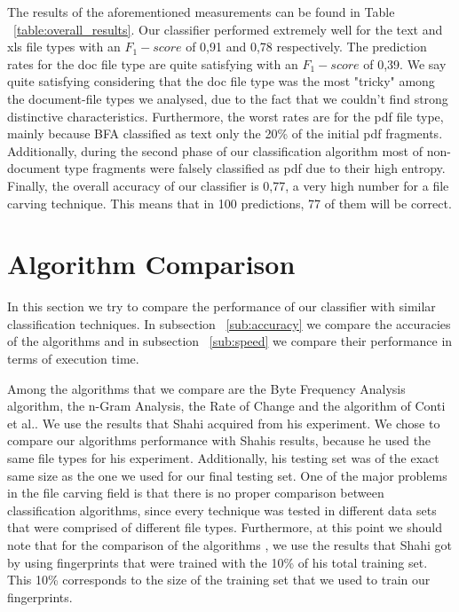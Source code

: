 The results of the aforementioned measurements can be found in Table ~\ref{table:overall_results}. Our classifier performed extremely well for the text and xls file types with an ${F_1}-score$ of 0,91 and 0,78 respectively. The prediction rates  for the doc file type are quite satisfying with an ${F_1}-score$  of 0,39. We say quite satisfying considering that the doc file type was the most "tricky" among the document-file types we analysed, due to the fact that we couldn't find strong distinctive characteristics. Furthermore, the worst rates are for the pdf file type, mainly because BFA classified as text only the 20\% of the initial pdf fragments. Additionally, during the second phase of our classification algorithm most of non-document type fragments were falsely classified as pdf due to their high entropy. Finally, the overall accuracy of our classifier is 0,77, a very high number for a file carving technique. This means that in 100 predictions, 77 of them will be correct.


\section{Algorithm Comparison}
In this section we try to compare the performance of our classifier with similar classification techniques. In subsection ~\ref{sub:accuracy} we compare the accuracies of the algorithms and in subsection ~\ref{sub:speed} we compare their performance in terms of execution time.

Among the algorithms that we compare are the Byte Frequency Analysis algorithm\cite{MacDaniel}, the n-Gram Analysis\cite{ngram}, the Rate of Change\cite{roc} and the algorithm of Conti et al.\cite{Conti}. We use the results that Shahi acquired from his experiment\cite{Ashim}. We chose to compare our algorithms performance with Shahis results, because he used the same file types for his experiment. Additionally, his testing set was of the exact same size as the one we used for our final testing set. One of the major problems in the file carving field is that there is no proper comparison between classification algorithms, since every technique was tested in different data sets that were comprised of different file types. Furthermore, at this point we should note that for the comparison of the algorithms , we use the results that Shahi got by using fingerprints that were trained with the 10\% of his total training set. This 10\% corresponds to the size of the training set that we used to train our fingerprints.


